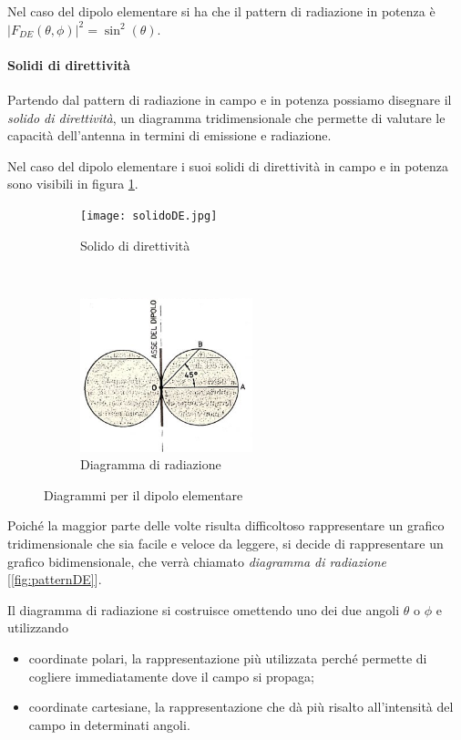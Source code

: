 Nel caso del dipolo elementare si ha che il pattern di radiazione in potenza è
$|F_{DE}(\theta,\phi)|^2 = \sin^2(\theta)$.

\paragraph{Solidi di direttività}
Partendo dal pattern di radiazione in campo e in potenza possiamo disegnare il \emph{solido di direttività}, un diagramma tridimensionale che permette di valutare le capacità dell'antenna in termini di emissione e radiazione.

Nel caso del dipolo elementare i suoi solidi di direttività in campo e in potenza sono visibili in figura \ref{fig:solidoDE}.
\begin{figure}[t!]
    \centering
    \begin{subfigure}[b]{0.5\textwidth}
        \centering
        \texttt{[image: solidoDE.jpg]}
        \caption{Solido di direttività}
				\label{fig:solidoDE}
    \end{subfigure}%
    ~
    \begin{subfigure}[b]{0.5\textwidth}
        \centering
        \includegraphics[width=5cm]{img/patternDE.png}
        \caption{Diagramma di radiazione}
				\label{fig:patternDE}
    \end{subfigure}
    \caption{Diagrammi per il dipolo elementare}
\end{figure}

Poiché la maggior parte delle volte risulta difficoltoso rappresentare un grafico tridimensionale che sia facile e veloce da leggere, si decide di rappresentare un grafico bidimensionale, che verrà chiamato \emph{diagramma di radiazione} [\autoref{fig:patternDE}].

Il diagramma di radiazione si costruisce omettendo uno dei due angoli $\theta$ o $\phi$ e utilizzando
\begin{itemize}
	\item coordinate polari, la rappresentazione più utilizzata perché permette di cogliere immediatamente dove il campo si propaga;
	\item coordinate cartesiane, la rappresentazione che dà più risalto all'intensità del campo in determinati angoli.
\end{itemize}

